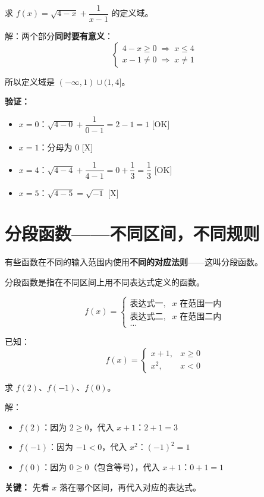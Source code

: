 \begin{examplebox}[12]
求 \(f(x) = \sqrt{4 - x} + \dfrac{1}{x - 1}\) 的定义域。

解：两个部分\textbf{同时要有意义}：
\[
\begin{cases}
4 - x \ge 0 \;\Longrightarrow\; x \le 4 \\
x - 1 \neq 0 \;\Longrightarrow\; x \neq 1
\end{cases}
\]

所以定义域是 \((-\infty, 1) \cup (1, 4]\)。

\textbf{验证：}
\begin{itemize}
  \item \(x = 0\)：\(\sqrt{4 - 0} + \dfrac{1}{0 - 1} = 2 - 1 = 1\) [OK]
  \item \(x = 1\)：分母为 0 [X]
  \item \(x = 4\)：\(\sqrt{4 - 4} + \dfrac{1}{4 - 1} = 0 + \dfrac{1}{3} = \dfrac{1}{3}\) [OK]
  \item \(x = 5\)：\(\sqrt{4 - 5} = \sqrt{-1}\) [X]
\end{itemize}
\end{examplebox}


\section{分段函数——不同区间，不同规则}

有些函数在不同的输入范围内使用\textbf{不同的对应法则}——这叫分段函数。

\begin{definitionbox}[分段函数]
分段函数是指在不同区间上用不同表达式定义的函数。

\[
f(x) =
\left\{
\begin{array}{ll}
\text{表达式一}, & x \text{ 在范围一内} \\
\text{表达式二}, & x \text{ 在范围二内} \\
\ldots
\end{array}
\right.
\]
\end{definitionbox}

\begin{examplebox}[13]
已知：
\[
f(x) =
\begin{cases}
x + 1, & x \ge 0 \\
x^2,   & x < 0
\end{cases}
\]

求 \(f(2)\)、\(f(-1)\)、\(f(0)\)。

解：
\begin{itemize}
  \item \(f(2)\)：因为 \(2 \ge 0\)，代入 \(x + 1\)：\(2 + 1 = 3\)
  \item \(f(-1)\)：因为 \(-1 < 0\)，代入 \(x^2\)：\((-1)^2 = 1\)
  \item \(f(0)\)：因为 \(0 \ge 0\)（包含等号），代入 \(x + 1\)：\(0 + 1 = 1\)
\end{itemize}

\textbf{关键：} 先看 \(x\) 落在哪个区间，再代入对应的表达式。
\end{examplebox}

